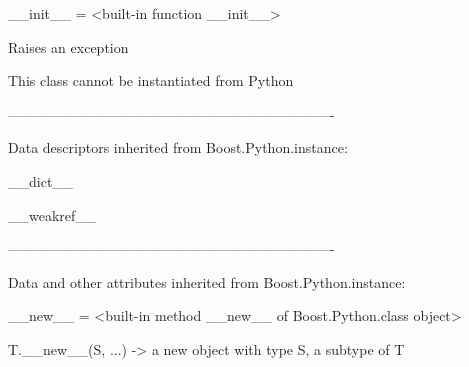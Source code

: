 \documentclass[letterpaper,10pt,english]{sphinxmanual}
\begin{document}
\begin{description}
\begin{description}
\begin{DUlineblock}{0em}
\item[] \_\_init\_\_ = \textless{}built-in function \_\_init\_\_\textgreater{}
\item[]
\begin{DUlineblock}{\DUlineblockindent}
\item[] Raises an exception
\item[] This class cannot be instantiated from Python
\item[] 
\end{DUlineblock}
\item[] ----------------------------------------------------------------------
\item[] Data descriptors inherited from Boost.Python.instance:
\item[] 
\item[] \_\_dict\_\_
\item[] 
\item[] \_\_weakref\_\_
\item[] 
\item[] ----------------------------------------------------------------------
\item[] Data and other attributes inherited from Boost.Python.instance:
\item[] 
\item[] \_\_new\_\_ = \textless{}built-in method \_\_new\_\_ of Boost.Python.class object\textgreater{}
\item[]
\begin{DUlineblock}{\DUlineblockindent}
\item[] T.\_\_new\_\_(S, ...) -\textgreater{} a new object with type S, a subtype of T
\end{DUlineblock}
\end{DUlineblock}


\end{description}
\end{description}
\end{document}
